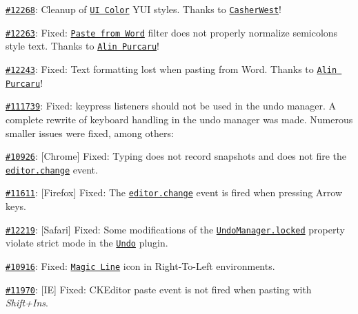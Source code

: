 \begin{DoxyItemize}
\item \href{http://dev.ckeditor.com/ticket/12268}{\tt \#12268}\+: Cleanup of \href{http://ckeditor.com/addon/uicolor}{\tt UI Color} Y\+UI styles. Thanks to \href{https://github.com/CasherWest}{\tt Casher\+West}!
\item \href{http://dev.ckeditor.com/ticket/12263}{\tt \#12263}\+: Fixed\+: \href{http://ckeditor.com/addon/pastefromword}{\tt Paste from Word} filter does not properly normalize semicolons style text. Thanks to \href{https://github.com/mesmerizero}{\tt Alin Purcaru}!
\item \href{http://dev.ckeditor.com/ticket/12243}{\tt \#12243}\+: Fixed\+: Text formatting lost when pasting from Word. Thanks to \href{https://github.com/mesmerizero}{\tt Alin Purcaru}!
\item \href{http://dev.ckeditor.com/ticket/11739}{\tt \#111739}\+: Fixed\+: {\ttfamily keypress} listeners should not be used in the undo manager. A complete rewrite of keyboard handling in the undo manager was made. Numerous smaller issues were fixed, among others\+:
\begin{DoxyItemize}
\item \href{http://dev.ckeditor.com/ticket/10926}{\tt \#10926}\+: \mbox{[}Chrome\mbox{]} Fixed\+: Typing does not record snapshots and does not fire the \href{http://docs.ckeditor.com/#!/api/CKEDITOR.editor-event-change}{\tt {\ttfamily editor.\+change}} event.
\item \href{http://dev.ckeditor.com/ticket/11611}{\tt \#11611}\+: \mbox{[}Firefox\mbox{]} Fixed\+: The \href{http://docs.ckeditor.com/#!/api/CKEDITOR.editor-event-change}{\tt {\ttfamily editor.\+change}} event is fired when pressing Arrow keys.
\item \href{http://dev.ckeditor.com/ticket/12219}{\tt \#12219}\+: \mbox{[}Safari\mbox{]} Fixed\+: Some modifications of the \href{http://docs.ckeditor.com/#!/api/CKEDITOR.plugins.undo.UndoManager-property-locked}{\tt {\ttfamily Undo\+Manager.\+locked}} property violate strict mode in the \href{http://ckeditor.com/addon/undo}{\tt Undo} plugin.
\end{DoxyItemize}
\item \href{http://dev.ckeditor.com/ticket/10916}{\tt \#10916}\+: Fixed\+: \href{http://ckeditor.com/addon/magicline}{\tt Magic Line} icon in Right-\/\+To-\/\+Left environments.
\item \href{http://dev.ckeditor.com/ticket/11970}{\tt \#11970}\+: \mbox{[}IE\mbox{]} Fixed\+: C\+K\+Editor {\ttfamily paste} event is not fired when pasting with {\itshape Shift+\+Ins}.

\end{DoxyItemize}
